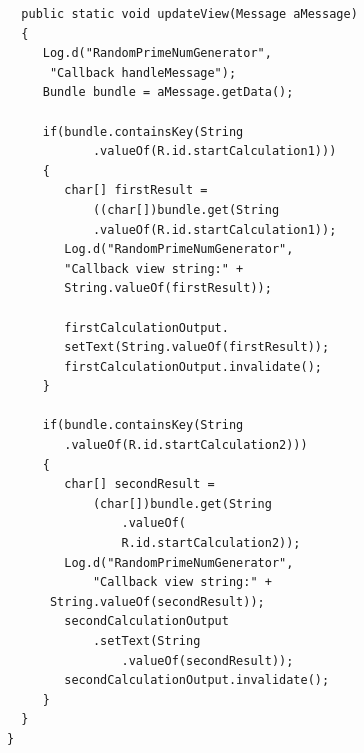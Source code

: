 \documentclass[12pt,oneside,a4paper,bibtotoc,liststotoc]{scrreprt}
\begin{document}
\begin{lstlisting}
  public static void updateView(Message aMessage)
  { 
     Log.d("RandomPrimeNumGenerator",
      "Callback handleMessage");
     Bundle bundle = aMessage.getData();

     if(bundle.containsKey(String
     		.valueOf(R.id.startCalculation1)))
     {
        char[] firstResult = 
        	((char[])bundle.get(String
        	.valueOf(R.id.startCalculation1));
        Log.d("RandomPrimeNumGenerator",
        "Callback view string:" + 
        String.valueOf(firstResult));

        firstCalculationOutput.
        setText(String.valueOf(firstResult));
        firstCalculationOutput.invalidate();
     }

     if(bundle.containsKey(String
     	.valueOf(R.id.startCalculation2)))
     {
        char[] secondResult = 
        	(char[])bundle.get(String
        		.valueOf(
        		R.id.startCalculation2));
        Log.d("RandomPrimeNumGenerator", 
        	"Callback view string:" +                                                                                                                                                                 
      String.valueOf(secondResult));
        secondCalculationOutput
        	.setText(String
        		.valueOf(secondResult));
        secondCalculationOutput.invalidate();
     }
  }
}
\end{lstlisting}
\end{document}
